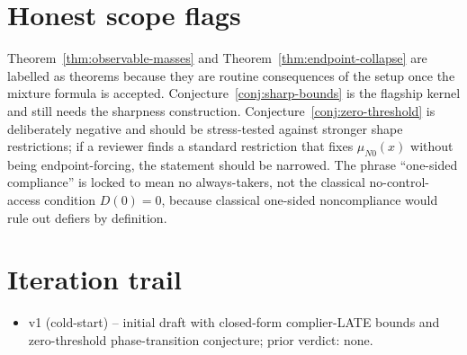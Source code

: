\documentclass[11pt]{article}
\theoremstyle{definition}
\theoremstyle{plain}
\theoremstyle{remark}
\begin{document}
\section{Honest scope flags}
Theorem~\ref{thm:observable-masses} and Theorem~\ref{thm:endpoint-collapse} are labelled as theorems because they are routine consequences of the setup once the mixture formula is accepted.  Conjecture~\ref{conj:sharp-bounds} is the flagship kernel and still needs the sharpness construction.  Conjecture~\ref{conj:zero-threshold} is deliberately negative and should be stress-tested against stronger shape restrictions; if a reviewer finds a standard restriction that fixes \(\mu_{N0}(x)\) without being endpoint-forcing, the statement should be narrowed.  The phrase ``one-sided compliance'' is locked to mean no always-takers, not the classical no-control-access condition \(D(0)=0\), because classical one-sided noncompliance would rule out defiers by definition.

\section{Iteration trail}
\begin{itemize}[leftmargin=*]
\item v1 (cold-start) -- initial draft with closed-form complier-LATE bounds and zero-threshold phase-transition conjecture; prior verdict: none.
\end{itemize}
\end{document}
